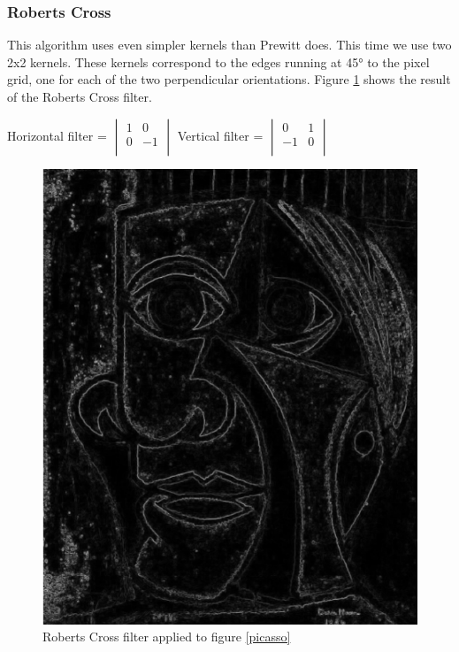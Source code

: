 \documentclass[12pt]{article}
\begin{document}
\subsubsection{Roberts Cross}
This algorithm uses even simpler kernels than Prewitt does. This time we use two 2x2 kernels. These kernels correspond to the edges running at 45° to the pixel grid, one for each of the two perpendicular orientations. Figure \ref{robertscross} shows the result of the Roberts Cross filter.
\newline

Horizontal filter = $\begin{vmatrix}
        1 & 0 \\
        0 & -1 \\
\end{vmatrix}$\hspace{11mm}
Vertical filter = $\begin{vmatrix}
        0 & 1\\
        -1 & 0\\
\end{vmatrix}$

\begin{figure}[h]
\centering
\includegraphics[scale = 0.39]{img/picassoRobertsCross}
\caption{Roberts Cross filter applied to figure \ref{picasso}}
\label{robertscross}
\end{figure}
\end{document}
